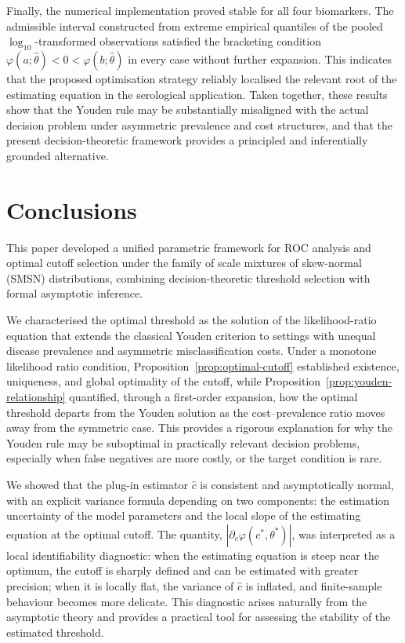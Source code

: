 \documentclass[11pt,a4paper]{article}
\theoremstyle{definition}
\theoremstyle{remark}
\newcommand{\1}{\mathbf{1}}
\begin{document}
Finally, the numerical implementation proved stable for all four
biomarkers.
The admissible interval constructed from extreme empirical quantiles
of the pooled $\log_{10}$-transformed observations satisfied the
bracketing condition
$\varphi(a;\hat\theta)<0<\varphi(b;\hat\theta)$ in every case without further expansion.
This indicates that the proposed optimisation strategy reliably localised the relevant root of the estimating equation in the serological application.
Taken together, these results show that the Youden rule may be substantially misaligned with the actual decision problem under asymmetric prevalence and cost structures, and that the present decision-theoretic framework provides a principled and inferentially grounded alternative.

\section{Conclusions}\label{sec:discussion}

This paper developed a unified parametric framework for ROC analysis and optimal cutoff selection under the family of scale mixtures of skew-normal (SMSN) distributions, combining decision-theoretic threshold selection with formal asymptotic inference.

We characterised the optimal threshold as the solution of the likelihood-ratio equation that extends the classical Youden criterion
to settings with unequal disease prevalence and asymmetric
misclassification costs. Under a monotone likelihood ratio condition,
Proposition~\ref{prop:optimal-cutoff} established existence, uniqueness, and global optimality of the cutoff, while Proposition~\ref{prop:youden-relationship} quantified, through a first-order expansion, how the optimal threshold departs from the Youden solution as the cost--prevalence ratio moves away from the symmetric case. This provides a rigorous explanation for why the Youden rule may be suboptimal in practically relevant decision problems, especially when false negatives are more costly, or the target condition is rare.

We showed that the plug-in estimator $\hat c$ is consistent and asymptotically normal, with an explicit variance formula depending on two components: the estimation uncertainty of the model parameters and the local slope of the estimating equation at the optimal cutoff.
The quantity, $|\partial_c\varphi(c^*,\theta^*)|$, was interpreted as a local identifiability diagnostic: when the estimating equation is steep near the optimum, the cutoff is sharply defined and can be estimated with greater precision; when it is locally flat, the variance of $\hat c$ is inflated, and finite-sample behaviour becomes more delicate. This diagnostic arises naturally from the asymptotic theory and provides a practical tool for assessing the stability of the estimated threshold.
\end{document}
